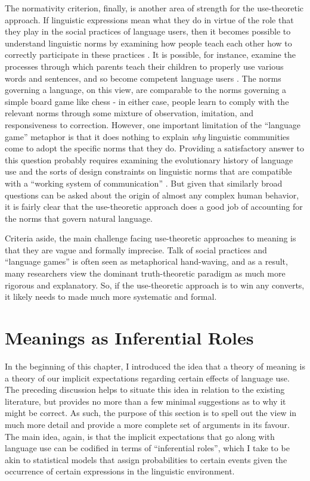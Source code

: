 The normativity criterion, finally, is another area of strength for the use-theoretic approach. If linguistic expressions mean what they do in virtue of the role that they play in the social practices of language users, then it becomes possible to understand linguistic norms by examining how people teach each other how to correctly participate in these practices \citep{Brandom:1994,Wittgenstein:1953,Kripke:1982}. It is possible, for instance, examine the processes through which parents teach their children to properly use various words and sentences, and so become competent language users \citep{Brandom:2010,Sellars:1954}. The norms governing a language, on this view, are comparable to the norms governing a simple board game like chess - in either case, people learn to comply with the relevant norms through some mixture of observation, imitation, and responsiveness to correction. However, one important limitation of the ``language game'' metaphor is that it does nothing to explain \textit{why} linguistic communities come to adopt the specific norms that they do. Providing a satisfactory answer to this question probably requires examining the evolutionary history of language use and the sorts of design constraints on linguistic norms that are compatible with a ``working system of communication'' \citep[][p. 54]{Dennett:2010}. But given that similarly broad questions can be asked about the origin of almost any complex human behavior, it is fairly clear that the use-theoretic approach does a good job of accounting for the norms that govern natural language.

Criteria aside, the main challenge facing use-theoretic approaches to meaning is that they are vague and formally imprecise. Talk of social practices and ``language games'' is often seen as metaphorical hand-waving, and as a result, many researchers view the dominant truth-theoretic paradigm as much more rigorous and explanatory. So, if the use-theoretic approach is to win any converts, it likely needs to made much more systematic and formal. 

\section{Meanings as Inferential Roles}

In the beginning of this chapter, I introduced the idea that a theory of meaning is a theory of our implicit expectations regarding certain effects of language use. The preceding discussion helps to situate this idea in relation to the existing literature, but provides no more than a few minimal suggestions as to why it might be correct. As such, the purpose of this section is to spell out the view in much more detail and provide a more complete set of arguments in its favour. The main idea, again, is that the implicit expectations that go along with language use can be codified in terms of ``inferential roles'', which I take to be akin to statistical models that assign probabilities to certain events given the occurrence of certain expressions in the linguistic environment.

